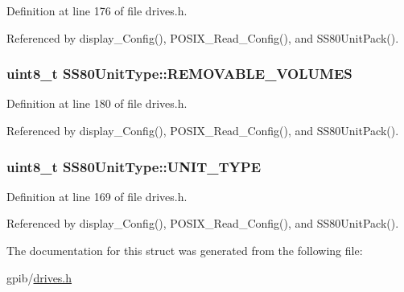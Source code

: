 Definition at line 176 of file drives.\+h.



Referenced by display\+\_\+\+Config(), P\+O\+S\+I\+X\+\_\+\+Read\+\_\+\+Config(), and S\+S80\+Unit\+Pack().

\subsubsection[{\texorpdfstring{R\+E\+M\+O\+V\+A\+B\+L\+E\+\_\+\+V\+O\+L\+U\+M\+ES}{REMOVABLE_VOLUMES}}]{\setlength{\rightskip}{0pt plus 5cm}uint8\+\_\+t S\+S80\+Unit\+Type\+::\+R\+E\+M\+O\+V\+A\+B\+L\+E\+\_\+\+V\+O\+L\+U\+M\+ES}\hypertarget{structSS80UnitType_a6dcef2939bd0a19951ad1592b1ec8c31}{}\label{structSS80UnitType_a6dcef2939bd0a19951ad1592b1ec8c31}


Definition at line 180 of file drives.\+h.



Referenced by display\+\_\+\+Config(), P\+O\+S\+I\+X\+\_\+\+Read\+\_\+\+Config(), and S\+S80\+Unit\+Pack().

\subsubsection[{\texorpdfstring{U\+N\+I\+T\+\_\+\+T\+Y\+PE}{UNIT_TYPE}}]{\setlength{\rightskip}{0pt plus 5cm}uint8\+\_\+t S\+S80\+Unit\+Type\+::\+U\+N\+I\+T\+\_\+\+T\+Y\+PE}\hypertarget{structSS80UnitType_ae00e42430682e849d83b1ca4c8f44013}{}\label{structSS80UnitType_ae00e42430682e849d83b1ca4c8f44013}


Definition at line 169 of file drives.\+h.



Referenced by display\+\_\+\+Config(), P\+O\+S\+I\+X\+\_\+\+Read\+\_\+\+Config(), and S\+S80\+Unit\+Pack().



The documentation for this struct was generated from the following file\+:\begin{DoxyCompactItemize}
\item 
gpib/\hyperlink{drives_8h}{drives.\+h}\end{DoxyCompactItemize}

